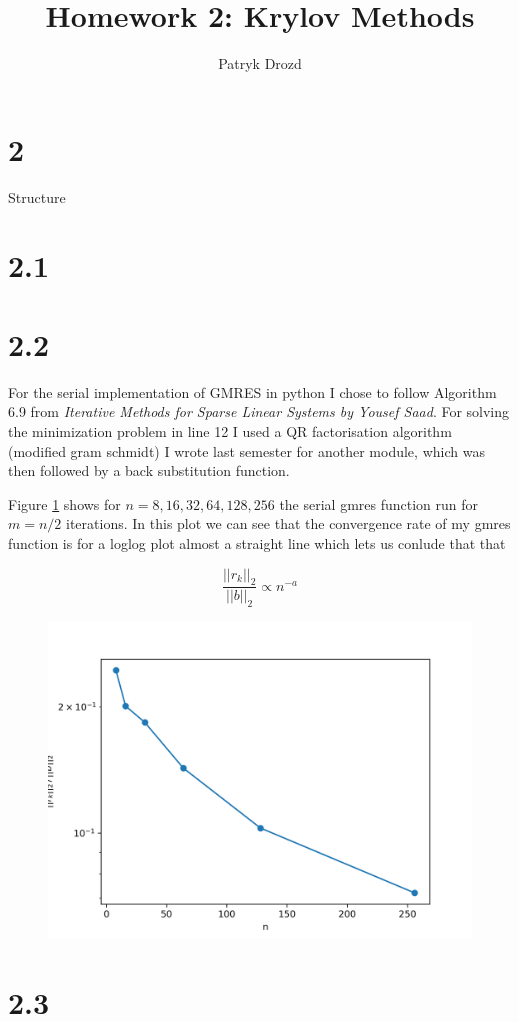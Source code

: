 \documentclass[a4paper]{article}
\title{Homework 2: Krylov Methods}
\author{Patryk Drozd}
\begin{document}
\date{}
\maketitle

\section*{2}
	Structure

\section*{2.1}

\section*{2.2}
	
	For the serial implementation of GMRES in python I chose to follow Algorithm 6.9 from 
	\textit{Iterative Methods for Sparse Linear Systems by Yousef Saad}. For solving the 
	minimization problem in line 12 I used a QR factorisation algorithm (modified gram schmidt)
	I wrote last semester for another module, which was then followed by a back substitution 
	function.

	Figure \ref{fig:q2_fig} shows for $n = 8, 16, 32, 64, 128, 256$ the serial gmres function run
	for $m = n/2$ iterations. In this plot we can see that the convergence rate of my gmres function
	is for a loglog plot almost a straight line which lets us conlude that that 

	$$\frac{||r_k||_2}{||b||_2} \propto n^{-a}$$


	\begin{figure}[h!]
	    \centering
    	\includegraphics[width=.8\linewidth]{./q2_fig.png}
    	\label{fig:q2_fig}
	\end{figure}

\section*{2.3}
		


 
 
\end{document}
